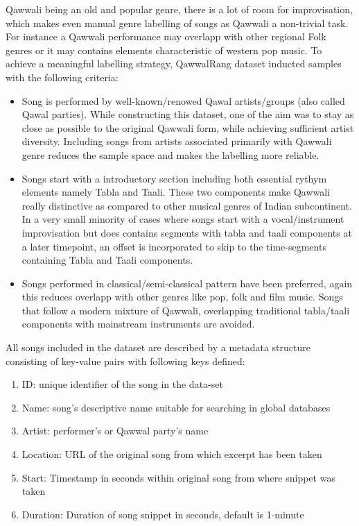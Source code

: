 \documentclass{article}
\begin{document}
Qawwali being an old and popular genre, there is a lot of room for improvisation, which makes even manual genre labelling of songs as Qawwali a non-trivial task. For instance a Qawwali performance may overlapp with other regional Folk genres or it may contains elements characteristic of western pop music. To achieve a meaningful labelling strategy, QawwalRang dataset inducted samples with the following criteria:
\begin{itemize}
\item Song is performed by well-known/renowed Qawal artists/groups (also called Qawal parties). While constructing this dataset, one of the aim was to stay as close as possible to the original Qawwali form, while achieving sufficient artist diversity. Including songs from artists associated primarily with Qawwali genre reduces the sample space and makes the labelling more reliable. 
\item Songs start with a introductory section including both essential rythym elements namely Tabla and Taali. These two components make Qawwali really distinctive as compared to other musical genres of Indian subcontinent. In a very small minority of cases where songs start with a vocal/instrument improvisation but does contains segments with tabla and taali components at a later timepoint, an offset is incorporated to skip to the time-segments containing Tabla and Taali components.
\item Songs performed in classical/semi-classical pattern have been preferred, again this reduces overlapp with other genres like pop, folk and film music. Songs that follow a modern mixture of Qawwali, overlapping traditional tabla/taali components with mainstream instruments are avoided.
\end{itemize}

All songs included in the dataset are described by a metadata structure consisting of key-value pairs with following keys defined:
\begin{enumerate}
\item ID: unique identifier of the song in the data-set
\item Name: song's descriptive name suitable for searching in global databases
\item Artist: performer's or Qawwal party's name
\item Location: URL of the original song from which excerpt has been taken
\item Start: Timestamp in seconds within original song from where snippet was taken
\item Duration: Duration of song snippet in seconds, default is 1-minute
\end{enumerate}
\end{document}
